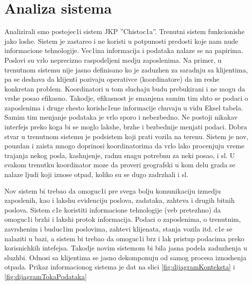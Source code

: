 \documentclass[10 pt]{article}
\begin{document}
	
	\section{Analiza sistema}
	
	Analizirali smo postojec1i sistem JKP ''Chistoc1a''. Trenutni sistem funkcionishe jako loshe. Sistem je zastareo i ne koristi u potpunosti predosti koje nam nude informacione tehnologije. Vec1ina informacija i podataka nalaze se na papirima. Poslovi su vrlo neprecizno raspodeljeni medju zaposlenima. Na primer, u trenutnom sistemu nije jasno definisano ko je zaduzhen za saradnju sa klijentima, pa se deshava da klijenti pozivaju operativce (koordinatore) da im reshe konkretan problem. Koordinatori u tom sluchaju budu prebukirani i ne mogu da vrshe posao efikasno. Takodje, efikasnost je smanjena samim tim shto se podaci o zaposlenima i druge chesto korishc1ene informacije chuvaju u vidu Eksel tabela. Samim tim menjanje podataka je vrlo sporo i nebezbedno. Ne postoji nikakav interfejs preko koga bi se moglo lakshe, brzhe i bezbednije menjati podaci. Dobra stvar u trenutnom sistemu je podsistem koji prati vozila na terenu. Sistem je nov, pouzdan i zaista mnogo doprinosi koordinatorima da  vrlo lako procenjuju vreme trajanja nekog posla, kashnjenje, radnu snagu potrebnu za neki posao, i sl. U svakom trenutku koordinator moze da proveri geografski u kom delu grada se nalaze ljudi koji iznose otpad, koliko su se dugo zadrzhali i sl.
	
	Nov sistem bi trebao da omoguc1i pre svega bolju komunikaciju izmedju zaposlenih, kao i lakshu evidenciju poslova, zadataka, zahteva i drugih bitnih poslova. Sistem c1e koristiti informacione tehnologije (veb pretezhno) da omoguc1i brzhi i lakshi protok informacija. Podaci o zaposlenima, o trenutnim, zavrshenim i buduc1im poslovima, zahtevi klijenata, stanja vozila itd. c1e se nalaziti u bazi, a sistem bi trebao da omoguc1i brz i lak pristup podacima preko korisnichkih intefejsa. Takodje novim sistemom bi bila jasna podela zaduzhenja u sluzhbi. Odnosi sa klijentima se jasno dekomponuju od samog procesa iznoshenja otpada. Prikaz informacionog sistema je dat na slici \ref{fig:dijagramKonteksta} i \ref{fig:dijagramTokaPodataka}
	
\end{document}
